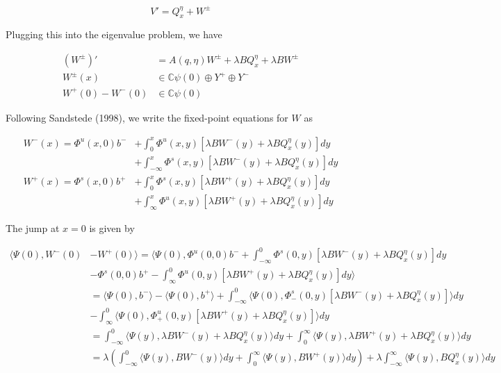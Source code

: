 \documentclass[12pt]{article}
\def\C{{\mathbb C}}
\begin{document}
\[
V' = Q^\eta_x + W^\pm
\]

Plugging this into the eigenvalue problem, we have

\begin{align*}
(W^\pm)' &= A(q, \eta)W^\pm + \lambda B Q^\eta_x + \lambda B W^\pm \\
W^\pm(x) &\in \C \psi(0) \oplus Y^+ \oplus Y^- \\
W^+(0) - W^-(0) &\in \C \psi(0) 
\end{align*}

Following Sandstede (1998), we write the fixed-point equations for $W$ as 

\begin{align*}
W^-(x) = \Phi^u(x, 0)b^- &+ \int_0^x \Phi^u(x, y)[\lambda B W^-(y) + \lambda B Q^\eta_x(y) ] dy \\
&+ \int_{-\infty}^x \Phi^s(x, y)[\lambda B W^-(y) + \lambda B Q^\eta_x(y) ] dy \\
W^+(x) = \Phi^s(x, 0)b^+ &+ \int_0^x \Phi^s(x, y)[\lambda B W^+(y) + \lambda B Q^\eta_x(y) ] dy \\
&+ \int_{\infty}^x \Phi^u(x, y)[\lambda B W^+(y) + \lambda B Q^\eta_x(y) ] dy
\end{align*}

The jump at $x = 0$ is given by

\begin{align*}
\langle\Psi(0), W^-(0) &- W^+(0)\rangle = \langle \Psi(0), \Phi^u(0, 0)b^- + \int_{-\infty}^0 \Phi^s(0, y)[\lambda B W^-(y) + \lambda B Q^\eta_x(y) ] dy  \\
&- \Phi^s(0, 0)b^+ - \int_\infty^0 \Phi^u(0, y)[\lambda B W^+(y) + \lambda B Q^\eta_x(y) ] dy \rangle\\
&= \langle \Psi(0), b^- \rangle - \langle \Psi(0), b^+ \rangle + \int_{-\infty}^0 \langle \Psi(0), \Phi^s_-(0, y)[\lambda B W^-(y) + \lambda B Q^\eta_x(y) ] \rangle dy  \\
&- \int_\infty^0 \langle \Psi(0), \Phi^u_+(0, y)[\lambda B W^+(y) + \lambda B Q^\eta_x(y) ] \rangle dy  \\
&= \int_{-\infty}^0 \langle \Psi(y), \lambda B W^-(y) + \lambda B Q^\eta_x(y) \rangle dy 
+ \int_0^\infty \langle \Psi(y), \lambda B W^+(y) + \lambda B Q^\eta_x(y)  \rangle dy \\
&= \lambda\left( \int_{-\infty}^0 \langle \Psi(y), B W^-(y) \rangle dy + \int_0^\infty \langle \Psi(y), B W^+(y) \rangle dy \right) + \lambda \int_{-\infty}^\infty \langle\Psi(y), BQ^\eta_x(y) \rangle dy
\end{align*}
\end{document}
